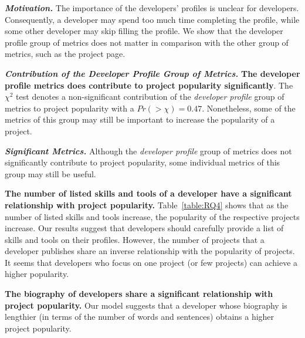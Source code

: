 


\noindent \textbf{\RQfour}



\vspace{0.1cm}

\noindent\textbf{\textit{Motivation.}} 
The importance of the developers' profiles is unclear for developers. Consequently, a developer may spend too much time completing the profile, while some other developer may skip filling the profile. We show that the developer profile group of metrics does not matter in comparison with the other group of metrics, such as the project page. 

\vspace{0.1cm}

\noindent\textbf{\textit{Contribution of the Developer Profile Group of Metrics.}} \textbf{The developer profile metrics does contribute to project popularity significantly}. The $\chi^2$ test denotes a non-significant contribution of the {\em developer profile} group of metrics to project popularity with a $Pr(>\chi)=0.47$. Nonetheless, some of the metrics of this group
may still be important to increase the popularity of a project.

\vspace{0.1cm}

\noindent\textbf{\textit{Significant Metrics.}} Although the {\em developer profile} group of metrics does not significantly contribute to project popularity, some individual metrics of this group may still be useful.



\textbf{The number of listed skills and tools of a developer have a significant relationship with project popularity.}
Table~\ref{table:RQ4} shows that as the number of listed skills and tools increase, the popularity of the respective projects increase. Our results suggest that developers should carefully provide a list of skills and tools on their profiles. However, the number of projects that a developer publishes share an inverse relationship with the popularity of projects. It seems that developers who focus on one project (or few projects) can achieve a higher popularity. 

\textbf{The biography of developers share a significant relationship with project popularity.} Our model suggests that a developer whose biography is lengthier (in terms of the number of words and sentences) obtains a higher project popularity.


